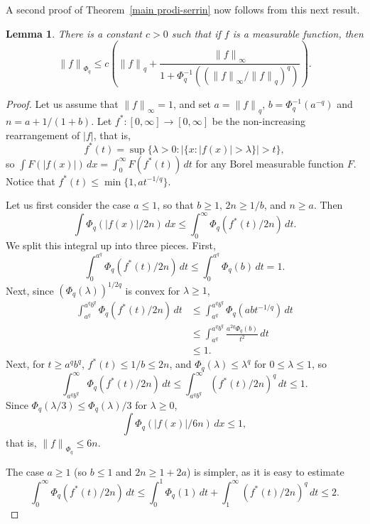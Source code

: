 \documentclass[12pt]{amsart}
\newtheorem{lemma}[thm]{Lemma}
\theoremstyle{remark}
\newcommand{\modo}[1]{{\left|#1\right|}}
\newcommand{\smodo}[1]{{\mathopen|#1\mathclose|}}
\newcommand{\snormo}[1]{{\mathopen\|#1\mathclose\|}}
\begin{document}
A second proof of Theorem~\ref{main prodi-serrin} now follows from
this next result.

\begin{lemma}  \label{upper bound for L_Phi}
There is a constant $c>0$ such that if $f$ is a measurable
function, then
$$
  \snormo f_{\Phi_q} \le c
  \left(\snormo f_q + 
  \frac{\snormo f_\infty}{1+\Phi_q^{-1}(({\snormo f_\infty}/{\snormo f_q})^q)}
  \right) .$$
\end{lemma}

\begin{proof}
Let us assume that $\snormo f_\infty = 1$, 
and set $a = \snormo f_q$, $b = \Phi_q^{-1}(a^{-q})$ and
$n = a+1/(1+b)$.  
Let $f^*:[0,\infty]\to[0,\infty]$ be the non-increasing rearrangement
of $\modo{f}$, that is,
$$ f^*(t) =  
   \sup \{ \lambda>0 : \smodo{\{ x:\smodo{f(x)}>\lambda\}} > t \} ,$$
so $\int F(\modo{f(x)}) \, dx = \int_0^\infty F(f^*(t)) \, dt$ for any
Borel measurable function $F$.  Notice that $f^*(t) \le \min\{1,a t^{-1/q}\}$.

Let us first
consider the case $a \le 1$, so that $b \ge 1$, $2n \ge 1/b$, and
$n \ge a$.
Then
$$
   \int \Phi_q(\modo{f(x)}/2n) \, dx
   \le
   \int_0^\infty \Phi_q(f^*(t)/2n) \, dt .$$
We split this integral up into three pieces.  First,
$$ 
   \int_0^{a^q} \Phi_q(f^*(t)/2n) \, dt 
   \le
   \int_0^{a^q} \Phi_q(b) \, dt 
   = 1.
$$
Next, since $(\Phi_q(\lambda))^{1/2q}$ is convex for $\lambda \ge 1$,
\begin{align*}
   \int_{a^q}^{a^q b^q} \Phi_q(f^*(t)/2n) \, dt 
   &\le
   \int_{a^q}^{a^q b^q} \Phi_q(abt^{-1/q}) \, dt \\
   &\le 
   \int_{a^q}^{a^q b^q} \frac{a^{2q}\Phi_q(b)}{t^2} \, dt  \\
   &\le 1.
\end{align*}
Next, for $t \ge a^q b^q$, $f^*(t) \le 1/b \le 2n$, and
$\Phi_q(\lambda) \le \lambda^q$ for $0 \le \lambda \le 1$, so
$$
   \int_{a^q b^q}^\infty \Phi_q(f^*(t)/2n) \, dt 
   \le
   \int_{a^q b^q}^\infty (f^*(t)/2n)^q \, dt 
   \le 1.
$$
Since $\Phi_q(\lambda/3) \le \Phi_q(\lambda)/3$ for
$\lambda\ge0$,
$$
   \int \Phi_q(\modo{f(x)}/6n) \, dx
   \le 1 ,
$$
that is, $\snormo f_{\Phi_q} \le 6 n$.

The case $a \ge 1$ (so $b \le 1$ and $2n \ge 1+2a$) is simpler, as
it is easy to estimate
$$
   \int_0^\infty \Phi_q(f^*(t)/2n) \, dt 
   \le
   \int_0^1 \Phi_q(1) \, dt 
   +
   \int_1^\infty (f^*(t)/2n)^q \, dt 
   \le 2.
$$

\end{proof}
\end{document}
